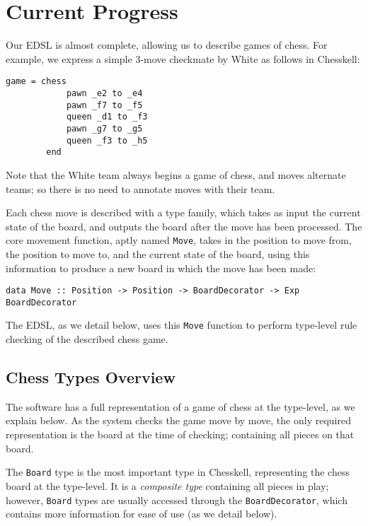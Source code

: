 \documentclass[12pt, a4paper, bibliography=totocnumbered]{scrartcl}
\begin{document}
\section{Current Progress} \label{examplegame}

Our EDSL is almost complete, allowing us to describe games of chess. For example, we express a simple 3-move checkmate by White as follows in Chesskell:

\begin{lstlisting}
game = chess
            pawn _e2 to _e4
            pawn _f7 to _f5
            queen _d1 to _f3
            pawn _g7 to _g5
            queen _f3 to _h5
        end
\end{lstlisting}

Note that the White team always begins a game of chess, and moves alternate teams; so there is no need to annotate moves with their team.

Each chess move is described with a type family, which takes as input the current state of the board, and outputs the board after the move has been processed. The core movement function, aptly named \lstinline{Move}, takes in the position to move from, the position to move to, and the current state of the board, using this information to produce a new board in which the move has been made:

\begin{lstlisting}
data Move :: Position -> Position -> BoardDecorator -> Exp BoardDecorator
\end{lstlisting}

The EDSL, as we detail below, uses this \lstinline{Move} function to perform type-level rule checking of the described chess game.

\subsection{Chess Types Overview}

The software has a full representation of a game of chess at the type-level, as we explain below. As the system checks the game move by move, the only required representation is the board at the time of checking; containing all pieces on that board.

The \lstinline{Board} type is the most important type in Chesskell, representing the chess board at the type-level. It is a \emph{composite type} containing all pieces in play; however, \lstinline{Board} types are usually accessed through the \lstinline{BoardDecorator}, which contains more information for ease of use (as we detail below).
\end{document}
